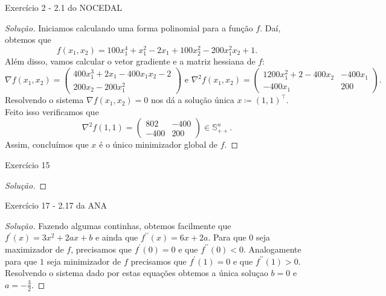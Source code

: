\documentclass[12pt,twoside,a4paper]{article}
\begin{document}
\begin{problema}\label{rosenmin}
Exercício 2 - 2.1 do NOCEDAL
\end{problema}
\begin{proof}[Solução]
  Iniciamos calculando uma forma polinomial para a função \(f\).
  Daí, obtemos que
  \begin{equation}\label{rosenfunc}
   f(x_1,x_2)=100x_1^4+x_1^2-2x_1+100x_2^2-200x_1^2x_2+1. 
  \end{equation}
   Além disso, vamos calcular o vetor gradiente e a matriz hessiana de \(f\):
\begin{equation}\label{gradrosen}
  \nabla f(x_1,x_2)=\begin{pmatrix}
    400x_1^3 + 2x_1-400x_1x_2 -2 \\
    200 x_2 - 200x_1^2
  \end{pmatrix}
  \text{ e } \nabla^2 f(x_1,x_2)=\begin{pmatrix}
    1200x_1^2+2-400x_2 & -400x_1 \\
    -400x_1 & 200
    \end{pmatrix}.
\end{equation}
Resolvendo o sistema \(\nabla f(x_1,x_2)=0\) nos dá a solução única
\(x\coloneqq(1,1)^\top\). Feito isso verificamos que
\[\nabla^2f(1,1)=\begin{pmatrix}
    802 & -400 \\
    -400 & 200 \end{pmatrix}\in\mathbb{S}^n_{++}.\]
Assim, concluímos que \(x\) é o único minimizador global de \(f\).
\end{proof}

\begin{problema}
  Exercício 15
\end{problema}
\begin{proof}[Solução]
  
\end{proof}

\begin{problema}
 Exercício 17 - 2.17 da ANA  
 \end{problema}
 \begin{proof}[Solução]
   Fazendo algumas continhas, obtemos facilmente que
   \(f^\prime(x)= 3x^2+2ax+b\) e
  ainda que \(f^{\prime\prime}(x)=6x+2a\). Para que \(0\) seja maximizador
  de
  \(f\), precisamos que \(f^\prime(0) =0\) e que \(f^{\prime\prime}(0)<0\).
  Analogamente para que \(1\) seja minimizador de \(f\) precisamos que
  \(f^\prime(1)=0\) e que \(f^{\prime\prime}(1)>0\). Resolvendo o sistema
  dado por estas equações obtemos a única soluçao \(b=0\) e \(a=-\frac{3}{2}\). 
 \end{proof}
\end{document}
